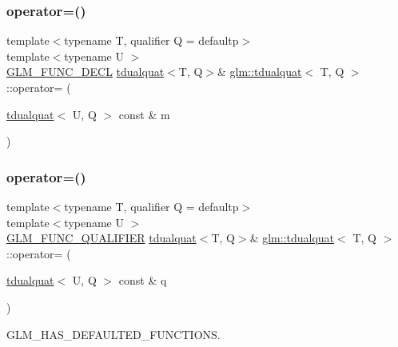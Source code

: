 \subsubsection{\texorpdfstring{operator=()}{operator=()}\hspace{0.1cm}{\footnotesize\ttfamily [2/3]}}
{\footnotesize\ttfamily template$<$typename T, qualifier Q = defaultp$>$ \\
template$<$typename U $>$ \\
\hyperlink{setup_8hpp_ab2d052de21a70539923e9bcbf6e83a51}{G\+L\+M\+\_\+\+F\+U\+N\+C\+\_\+\+D\+E\+CL} \hyperlink{structglm_1_1tdualquat}{tdualquat}$<$T, Q$>$\& \hyperlink{structglm_1_1tdualquat}{glm\+::tdualquat}$<$ T, Q $>$\+::operator= (\begin{DoxyParamCaption}\item[{\hyperlink{structglm_1_1tdualquat}{tdualquat}$<$ U, Q $>$ const \&}]{m }\end{DoxyParamCaption})}

\mbox{\label{structglm_1_1tdualquat_a6bdd31159c6bf9d7bca75971c2a1e512}} 
\subsubsection{\texorpdfstring{operator=()}{operator=()}\hspace{0.1cm}{\footnotesize\ttfamily [3/3]}}
{\footnotesize\ttfamily template$<$typename T, qualifier Q = defaultp$>$ \\
template$<$typename U $>$ \\
\hyperlink{setup_8hpp_a33fdea6f91c5f834105f7415e2a64407}{G\+L\+M\+\_\+\+F\+U\+N\+C\+\_\+\+Q\+U\+A\+L\+I\+F\+I\+ER} \hyperlink{structglm_1_1tdualquat}{tdualquat}$<$T, Q$>$\& \hyperlink{structglm_1_1tdualquat}{glm\+::tdualquat}$<$ T, Q $>$\+::operator= (\begin{DoxyParamCaption}\item[{\hyperlink{structglm_1_1tdualquat}{tdualquat}$<$ U, Q $>$ const \&}]{q }\end{DoxyParamCaption})}



G\+L\+M\+\_\+\+H\+A\+S\+\_\+\+D\+E\+F\+A\+U\+L\+T\+E\+D\+\_\+\+F\+U\+N\+C\+T\+I\+O\+NS. 

\mbox{\label{structglm_1_1tdualquat_a23ea50ee4bf311b8d37155ebec56dd90}} 
